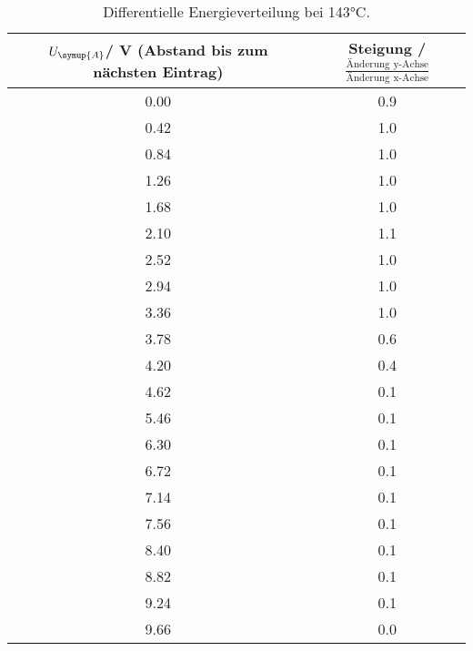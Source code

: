 \begin{table}[!htp]
\centering
\caption{Differentielle Energieverteilung bei 143°C.}
\label{tab:messreihe2}
\begin{tabular}{c c}
\toprule
{$U_{\symup{A}}$/ V (Abstand bis zum nächsten Eintrag)} & {Steigung  / $\frac{\text{Änderung y-Achse}}{\text{Änderung x-Achse}}$} \\
\midrule
0.00 & 0.9 \\
0.42 & 1.0 \\
0.84 & 1.0 \\
1.26 & 1.0 \\
1.68 & 1.0 \\
2.10 & 1.1 \\
2.52 & 1.0 \\
2.94 & 1.0 \\
3.36 & 1.0 \\
3.78 & 0.6 \\
4.20 & 0.4 \\
4.62 & 0.1 \\
5.46 & 0.1 \\
6.30 & 0.1 \\
6.72 & 0.1 \\
7.14 & 0.1 \\
7.56 & 0.1 \\
8.40 & 0.1 \\
8.82 & 0.1 \\
9.24 & 0.1 \\
9.66 & 0.0 \\
\bottomrule
\end{tabular}
\end{table}